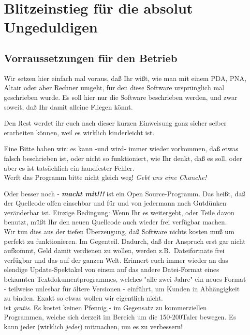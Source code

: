 \chapter{Blitzeinstieg für die absolut Ungeduldigen}\label{Blitzeinstieg}
\section{Vorraussetzungen für den Betrieb}
Wir setzen hier einfach mal voraus, daß Ihr wißt, wie man mit einem \textsf{PDA}, \textsf{PNA}, \textsf{Altair}  oder aber Rechner umgeht,  für den diese Software ursprünglich mal geschrieben wurde. Es soll hier nur die Software beschrieben werden, und zwar soweit, daß Ihr damit alleine Fliegen könnt.

Den Rest werdet ihr euch nach dieser kurzen Einweisung ganz sicher selber erarbeiten können, weil es wirklich kinderleicht ist.

Eine Bitte haben wir: es kann -und wird- immer wieder vorkommen, daß etwas falsch beschrieben ist, oder nicht so funktioniert, wie Ihr denkt, daß es soll, oder aber es ist tatsächlich ein handfester Fehler.\\[1em]

Werft das Programm bitte nicht gleich weg! \textsl{Gebt  uns eine Chanche!}

Oder besser noch - \textsl{\textbf{macht mit!!!}} \xc ist ein Open Source-Programm. Das heißt, daß der Quellcode offen einsehbar und für und von jedermann nach Gutdünken veränderbar ist. Einzige Bedingung: Wenn Ihr es weitergebt, oder Teile davon benutzt, müßt Ihr den neuen Quellcode auch wieder frei verfügbar machen.\\


Wir tun dies aus der tiefen Überzeugung, daß Software nichts kosten muß um perfekt zu funktionieren.
Im Gegenteil. Dadurch, daß der Anspruch erst gar nicht aufkommt, Geld damit verdienen zu wollen, werden z.B.\ Dateiformate frei verfügbar und das auf der ganzen Welt.  Erinnert euch immer wieder an das elendige Update-Spektakel von einem auf das andere Datei-Format eines bekannten Textdokumentprogrammes, welches "alle zwei Jahre" ein neues Format - teilweise unlesbar für ältere Versionen - einführt, um Kunden in Abhängigkeit zu binden. Exakt so etwas wollen wir eigentlich nicht.\\

\xc ist  \textit{gratis}. Es kostet keinen Pfennig - im Gegensatz zu kommerziellen Programmen, welche sich derzeit im Bereich um die 150-200Taler bewegen. Es kann jeder (wirklich \textsl{jeder}) mitmachen, um es zu verbessern!

